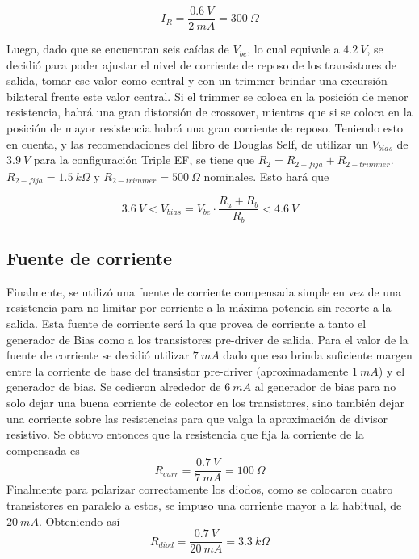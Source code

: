 \begin{equation}
I_R = \frac{0.6 \ V}{2 \ mA} = 300 \ \Omega
\end{equation}

Luego, dado que se encuentran seis caídas de $V_{be}$, lo cual equivale a $4.2 \ V$, se decidió para poder ajustar el nivel de corriente de reposo de los transistores de salida, tomar ese valor como central y con un trimmer brindar una excursión bilateral frente este valor central. Si el trimmer se coloca en la posición de menor resistencia, habrá una gran distorsión de crossover, mientras que si se coloca en la posición de mayor resistencia habrá una gran corriente de reposo. Teniendo esto en cuenta, y las recomendaciones del libro de Douglas Self, de utilizar un $V_{bias}$ de $3.9 \ V$ para la configuración Triple EF, se tiene que $R_2 = R_{2-fija} + R_{2-trimmer}$. $R_{2-fija} = 1.5 \ k\Omega$ y $R_{2-trimmer} = 500 \ \Omega$ nominales. Esto hará que

\begin{equation}
3.6 \ V < V_{bias} = V_{be}\cdot \frac{R_a + R_b}{R_b} < 4.6 \ V
\end{equation} 

\subsection{Fuente de corriente}

Finalmente, se utilizó una fuente de corriente compensada simple en vez de una resistencia para no limitar por corriente a la máxima potencia sin recorte a la salida. Esta fuente de corriente será la que provea de corriente a tanto el generador de Bias como a los transistores pre-driver de salida. Para el valor de la fuente de corriente se decidió utilizar $7 \ mA$ dado que eso brinda suficiente margen entre la corriente de base del transistor pre-driver (aproximadamente $1 \ mA$) y el generador de bias. Se cedieron alrededor de $6 \ mA$ al generador de bias para no solo dejar una buena corriente de colector en los transistores, sino también dejar una corriente sobre las resistencias para que valga la aproximación de divisor resistivo. Se obtuvo entonces que la resistencia que fija la corriente de la compensada es
\begin{equation}
R_{curr} = \frac{0.7 \ V}{7 \ mA} = 100 \ \Omega
\end{equation}
Finalmente para polarizar correctamente los diodos, como se colocaron cuatro transistores en paralelo a estos, se impuso una corriente mayor a la habitual, de $20 \ mA$. Obteniendo así
\begin{equation}
R_{diod} = \frac{0.7 \ V}{20 \ mA} = 3.3 \ k\Omega
\end{equation}

